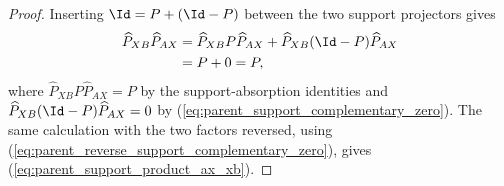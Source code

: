 \begin{proof}
    \leanok
    Inserting $\Id=P+(\Id-P)$ between the two support projectors gives
    \begin{align}
        \widehat P_{XB}\widehat P_{AX}
         & =\widehat P_{XB}P\widehat P_{AX}
        +\widehat P_{XB}(\Id-P)\widehat P_{AX} \notag \\
         & =P+0 =P,
        \notag
    \end{align}
    where $\widehat P_{XB}P\widehat P_{AX}=P$ by the support-absorption identities and
    $\widehat P_{XB}(\Id-P)\widehat P_{AX}=0$ by
    (\ref{eq:parent_support_complementary_zero}). The same calculation with
    the two factors reversed, using
    (\ref{eq:parent_reverse_support_complementary_zero}), gives
    (\ref{eq:parent_support_product_ax_xb}).
\end{proof}
